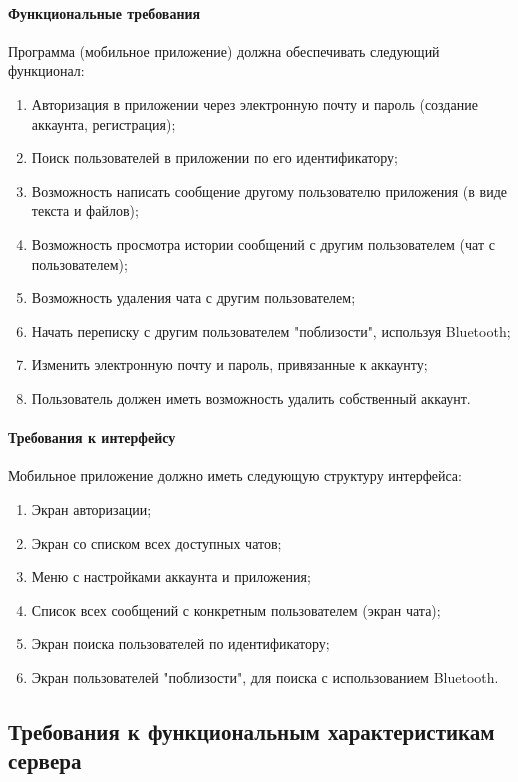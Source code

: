 \documentclass[explnote]{espd}
\begin{document}
\paragraph{Функциональные требования}

Программа (мобильное приложение) должна обеспечивать следующий функционал:

\begin{enumerate}
\item Авторизация в приложении через электронную почту и пароль (создание аккаунта, регистрация);
\item Поиск пользователей в приложении по его идентификатору;
\item Возможность написать сообщение другому пользователю приложения (в виде текста и файлов);
\item Возможность просмотра истории сообщений с другим пользователем (чат с пользователем);
\item Возможность удаления чата с другим пользователем;
\item Начать переписку с другим пользователем "поблизости", используя Bluetooth;
\item Изменить электронную почту и пароль, привязанные к аккаунту;
\item Пользователь должен иметь возможность удалить собственный аккаунт.
\end{enumerate}

\paragraph{Требования к интерфейсу}

Мобильное приложение должно иметь следующую структуру интерфейса:

\begin{enumerate}
\item Экран авторизации;
\item Экран со списком всех доступных чатов;
\item Меню с настройками аккаунта и приложения;
\item Список всех сообщений с конкретным пользователем (экран чата);
\item Экран поиска пользователей по идентификатору;
\item Экран пользователей "поблизости", для поиска с использованием Bluetooth.
\end{enumerate}

\subsection{Требования к функциональным характеристикам сервера}
\end{document}

